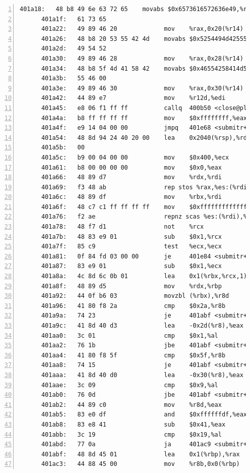 \documentclass{article}
\begin{document}
\begin{lstlisting}[title = bomb的反汇编代码及部分注释, xleftmargin = 2em,xrightmargin = 2em, aboveskip = 1em, numbers = left, basicstyle=\scriptsize\ttfamily, numberstyle=\scriptsize]
      401a18:	48 b8 49 6e 63 72 65 	movabs $0x6573616572636e49,%rax
      401a1f:	61 73 65 
      401a22:	49 89 46 20          	mov    %rax,0x20(%r14)
      401a26:	48 b8 20 53 55 42 4d 	movabs $0x5254494d42555320,%rax
      401a2d:	49 54 52 
      401a30:	49 89 46 28          	mov    %rax,0x28(%r14)
      401a34:	48 b8 5f 4d 41 58 42 	movabs $0x46554258414d5f,%rax
      401a3b:	55 46 00 
      401a3e:	49 89 46 30          	mov    %rax,0x30(%r14)
      401a42:	44 89 e7             	mov    %r12d,%edi
      401a45:	e8 06 f1 ff ff       	callq  400b50 <close@plt>
      401a4a:	b8 ff ff ff ff       	mov    $0xffffffff,%eax
      401a4f:	e9 14 04 00 00       	jmpq   401e68 <submitr+0x6bc>
      401a54:	48 8d 94 24 40 20 00 	lea    0x2040(%rsp),%rdx
      401a5b:	00 
      401a5c:	b9 00 04 00 00       	mov    $0x400,%ecx
      401a61:	b8 00 00 00 00       	mov    $0x0,%eax
      401a66:	48 89 d7             	mov    %rdx,%rdi
      401a69:	f3 48 ab             	rep stos %rax,%es:(%rdi)
      401a6c:	48 89 df             	mov    %rbx,%rdi
      401a6f:	48 c7 c1 ff ff ff ff 	mov    $0xffffffffffffffff,%rcx
      401a76:	f2 ae                	repnz scas %es:(%rdi),%al
      401a78:	48 f7 d1             	not    %rcx
      401a7b:	48 83 e9 01          	sub    $0x1,%rcx
      401a7f:	85 c9                	test   %ecx,%ecx
      401a81:	0f 84 fd 03 00 00    	je     401e84 <submitr+0x6d8>
      401a87:	83 e9 01             	sub    $0x1,%ecx
      401a8a:	4c 8d 6c 0b 01       	lea    0x1(%rbx,%rcx,1),%r13
      401a8f:	48 89 d5             	mov    %rdx,%rbp
      401a92:	44 0f b6 03          	movzbl (%rbx),%r8d
      401a96:	41 80 f8 2a          	cmp    $0x2a,%r8b
      401a9a:	74 23                	je     401abf <submitr+0x313>
      401a9c:	41 8d 40 d3          	lea    -0x2d(%r8),%eax
      401aa0:	3c 01                	cmp    $0x1,%al
      401aa2:	76 1b                	jbe    401abf <submitr+0x313>
      401aa4:	41 80 f8 5f          	cmp    $0x5f,%r8b
      401aa8:	74 15                	je     401abf <submitr+0x313>
      401aaa:	41 8d 40 d0          	lea    -0x30(%r8),%eax
      401aae:	3c 09                	cmp    $0x9,%al
      401ab0:	76 0d                	jbe    401abf <submitr+0x313>
      401ab2:	44 89 c0             	mov    %r8d,%eax
      401ab5:	83 e0 df             	and    $0xffffffdf,%eax
      401ab8:	83 e8 41             	sub    $0x41,%eax
      401abb:	3c 19                	cmp    $0x19,%al
      401abd:	77 0a                	ja     401ac9 <submitr+0x31d>
      401abf:	48 8d 45 01          	lea    0x1(%rbp),%rax
      401ac3:	44 88 45 00          	mov    %r8b,0x0(%rbp)

\end{lstlisting}
\end{document}
